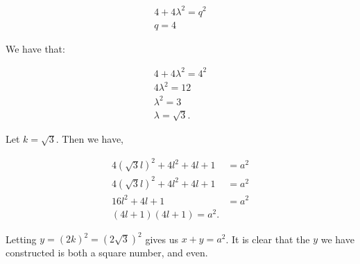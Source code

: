 \documentclass{article}
\begin{document}
\begin{align*}
4 + 4\lambda^2 = q^2 \\
q = 4
\end{align*}

We have that:

\begin{align*}
4 + 4\lambda^2 = 4^2 \\
4\lambda^2 = 12 \\
\lambda^2 = 3 \\
\lambda = \sqrt{3}.
\end{align*}

Let $k = \sqrt{3}$. Then we have,

\begin{align*}
4(\sqrt{3}l)^2 + 4l^2 + 4l + 1 &= a^2 \\
4(\sqrt{3}l)^2 + 4l^2 + 4l + 1 &= a^2 \\
16l^2 + 4l + 1 &= a^2 \\
(4l + 1)(4l + 1) = a^2.
\end{align*}

Letting $y = (2k)^2 = (2\sqrt{3})^2$ gives us $x + y = a^2$. It is clear that the $y$ we have constructed is both a square number, and even.
\end{document}
